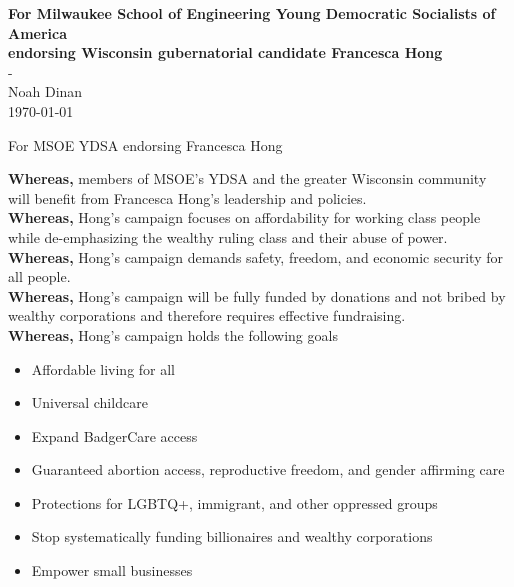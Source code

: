 \documentclass[12pt]{article}
\begin{document}
\begin{center}
\vspace*{\fill}

\textbf{For Milwaukee School of Engineering Young Democratic Socialists of America} \\
\textbf{endorsing Wisconsin gubernatorial candidate Francesca Hong} \\
- \\
Noah Dinan \\
\today \\

\vspace*{\fill}
\end{center}

\newpage

\onehalfspacing

\begin{center}
For MSOE YDSA endorsing Francesca Hong
\end{center}

\setlength{\parindent}{0in}



\textbf{Whereas,} members of MSOE's YDSA and the greater Wisconsin community will
benefit from Francesca Hong's leadership and policies. \\

\textbf{Whereas,} Hong's campaign focuses on affordability for working class people while de-emphasizing
the wealthy ruling class and their abuse of power. \\

\textbf{Whereas,} Hong's campaign demands safety, freedom, and economic security for all people. \\

\textbf{Whereas,} Hong's campaign will be fully funded by donations and not bribed by wealthy corporations
and therefore requires effective fundraising. \\

\textbf{Whereas,} Hong's campaign holds the following goals

\begin{itemize}
    \item Affordable living for all
    \item Universal childcare
    \item Expand BadgerCare access
    \item Guaranteed abortion access, reproductive freedom, and gender affirming care
    \item Protections for LGBTQ+, immigrant, and other oppressed groups
    \item Stop systematically funding billionaires and wealthy corporations
    \item Empower small businesses \\
\end{itemize}
\end{document}
